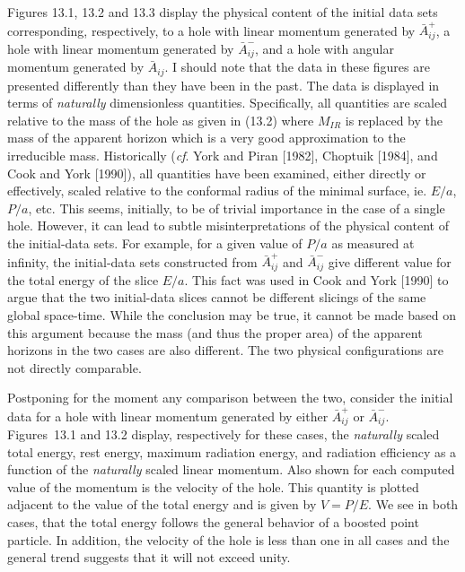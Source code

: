 Figures 13.1, 13.2 and 13.3 display the physical content of the initial data
sets corresponding, respectively, to a hole with linear momentum generated by
$\bar{A}^+_{ij}$, a hole with linear momentum generated by $\bar{A}^-_{ij}$, and
a hole with angular momentum generated by $\bar{A}_{ij}$.  I should note that
the data in these figures are presented differently than they have been in the
past.  The data is displayed in terms of {\it naturally} dimensionless
quantities.  Specifically, all quantities are scaled relative to the mass of the
hole as given in (13.2) where $M_{\scriptscriptstyle IR}$ is replaced by the mass
of the apparent horizon which is a very good approximation to the irreducible
mass.  Historically ({\it cf}. York and Piran [1982], Choptuik [1984], and Cook
and York [1990]), all quantities have been examined, either directly or
effectively, scaled relative to the conformal radius of the minimal surface, ie.
$E/a$, $P/a$, etc.  This seems, initially, to be of trivial importance in the
case of a single hole.  However, it can lead to subtle misinterpretations of
the physical content of the initial-data sets.  For example, for a given value
of $P/a$ as measured at infinity, the initial-data sets constructed from
$\bar{A}^+_{ij}$ and $\bar{A}^-_{ij}$ give different value for the total energy
of the slice $E/a$.  This fact was used in Cook and York [1990] to argue that
the two initial-data slices cannot be different slicings of the same global
space-time.  While the conclusion may be true, it cannot be made based on this
argument because the mass (and thus the proper area) of the apparent horizons in
the two cases are also different.  The two physical configurations are not
directly comparable.

Postponing for the moment any comparison between the two, consider the initial
data for a hole with linear momentum generated by either $\bar{A}^+_{ij}$ or
$\bar{A}^-_{ij}$.  Figures~13.1 and 13.2 display, respectively for these cases,
the {\it naturally} scaled total energy, rest energy, maximum radiation energy,
and radiation efficiency as a function of the {\it naturally} scaled linear
momentum.  Also shown for each computed value of the momentum is the velocity of
the hole.  This quantity is plotted adjacent to the value of the total energy
and is given by $V = P/E$.  We see in both cases, that the total energy follows
the general behavior of a boosted point particle.  In addition, the velocity of
the hole is less than one in all cases and the general trend suggests that it
will not exceed unity.

